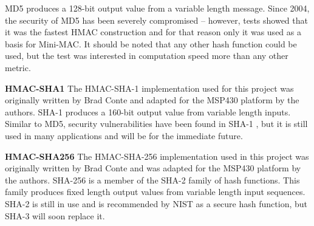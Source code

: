 MD5 produces a 128-bit output value from a variable length message. Since 2004, the security of MD5 has been severely compromised \cite{Wang-MD5} -- however, tests showed that it was the fastest HMAC construction and for that reason only it was used as a basis for Mini-MAC. It should be noted that any other hash function could be used, but the test was interested in computation speed more than any other metric\cite{MD5}.

\textbf{HMAC-SHA1}
The HMAC-SHA-1 implementation used for this project was originally written by Brad Conte \cite{Conte-SHA1} and adapted for the MSP430 platform by the authors. SHA-1 produces a 160-bit output value from variable length inputs. Similar to MD5, security vulnerabilities have been found in SHA-1 \cite{Wang-SHA1}, but it is still used in many applications and will be for the immediate future\cite{FIPS-180-4}.

\textbf{HMAC-SHA256}
The HMAC-SHA-256 implementation used in this project was originally written by Brad Conte \cite{Conte-SHA256} and was adapted for the MSP430 platform by the authors. SHA-256 is a member of the SHA-2 family of hash functions. This family produces fixed length output values from variable length input sequences. SHA-2 is still in use and is recommended by NIST as a secure hash function, but SHA-3 will soon replace it\cite{FIPS-180-4}.